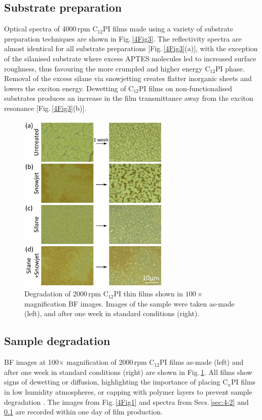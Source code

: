 \subsection{Substrate preparation}
\label{sec:4-3}
Optical spectra of 4000\,rpm C$_{12}$PI films made using a variety of substrate preparation techniques are shown in Fig.\,\ref{4Fig3}. The reflectivity spectra are almost identical for all substrate preparations [Fig.\,\ref{4Fig3}(a)], with the exception of the silanised substrate where excess APTES molecules led to increased surface roughness, thus favouring the more crumpled and higher energy C$_{12}$PI phase. Removal of the excess silane via snowjetting creates flatter inorganic sheets and lowers the exciton energy. Dewetting of C$_{12}$PI films on non-functionalised substrates produces an increase in the film transmittance away from the exciton resonance [Fig.\,\ref{4Fig3}(b)].

\begin{figure}[h!]
\centering
\includegraphics[width=0.65\textwidth]{Fig4}
\caption{Degradation of 2000\,rpm C$_{12}$PI thin films shown in $100\times$ magnification BF images. Images of the sample were taken as-made (left), and after one week in standard conditions (right).}
\label{4Fig4}
\end{figure}
\subsection{Sample degradation}
BF images at 100$\times$ magnification of 2000\,rpm C$_{12}$PI films as-made (left) and after one week in standard conditions (right) are shown in Fig.\,\ref{4Fig4}. All films show signs of dewetting or diffusion, highlighting the importance of placing C$_n$PI films in low humidity atmospheres, or capping with polymer layers to prevent sample degradation \cite{Pradeesh2009}. The images from Fig.\,\ref{4Fig1} and spectra from Secs.\,\ref{sec:4-2} and \ref{sec:4-3} are recorded within one day of film production.

